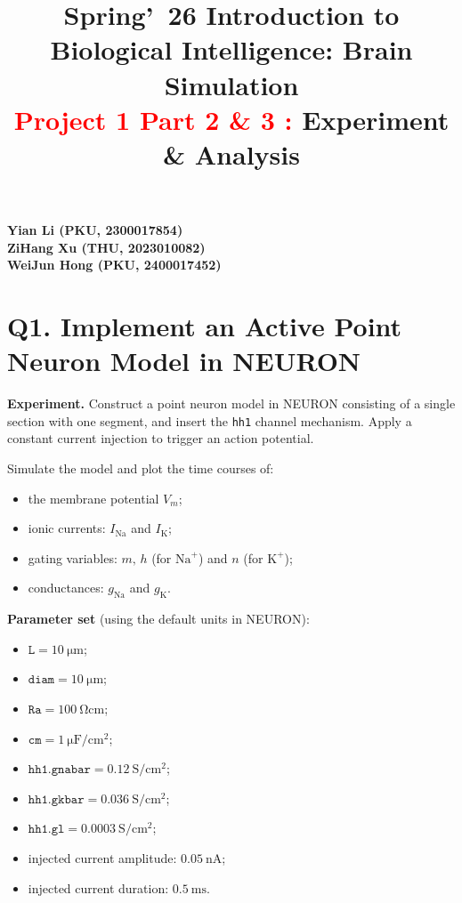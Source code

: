 \documentclass{article}
\title{\textbf{Spring'\ 26 \; Introduction to Biological Intelligence: Brain Simulation\\ \textcolor{red}{Project 1 Part 2 \& 3 :} Experiment \& Analysis}}
\author{}
\date{}
\begin{document}
\pagestyle{plain}
\maketitle

\vspace{-3.5em}

\begin{center}
\Large
\textbf{Yian Li (PKU, 2300017854)}\\
\textbf{ZiHang Xu (THU, 2023010082)}\\
\textbf{WeiJun Hong (PKU, 2400017452)}
\end{center}
\vspace{0.5em}

\clearpage

\section*{\textbf{Q1.} Implement an Active Point Neuron Model in NEURON}

\textbf{Experiment.}
Construct a point neuron model in \textsc{NEURON} consisting of a single section with one segment, and insert the \texttt{hh1} channel mechanism.
Apply a constant current injection to trigger an action potential.

Simulate the model and plot the time courses of:
\begin{itemize}
    \item the membrane potential $V_m$;
    \item ionic currents: $I_{\scriptscriptstyle\text{Na}}$ and $I_{\scriptscriptstyle\text{K}}$;
    \item gating variables: $m,\,h$ (for $\textrm{Na}^+$) and $n$ (for $\textrm{K}^+$);
    \item conductances: $g_{\scriptscriptstyle\text{Na}}$ and $g_{\scriptscriptstyle\text{K}}$.
\end{itemize}

\noindent\textbf{Parameter set} (using the default units in \textsc{NEURON}):

\begin{itemize}
    \item $\texttt{L} = \SI{10}{\micro\meter}$;
    \item $\texttt{diam} = \SI{10}{\micro\meter}$;
    \item $\texttt{Ra} = \SI{100}{\ohm\centi\meter}$;
    \item $\texttt{cm} = \SI{1}{\micro\farad\per\centi\meter\squared}$;
    \item $\texttt{hh1.gnabar} = \SI{0.12}{\siemens\per\centi\meter\squared}$;
    \item $\texttt{hh1.gkbar} = \SI{0.036}{\siemens\per\centi\meter\squared}$;
    \item $\texttt{hh1.gl} = \SI{0.0003}{\siemens\per\centi\meter\squared}$;
    \item injected current amplitude: $\SI{0.05}{\nano\ampere}$;
    \item injected current duration: $\SI{0.5}{\milli\second}$.
\end{itemize}
\end{document}
